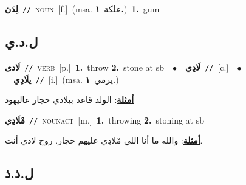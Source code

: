 \documentclass[10pt,a4paper,twoside]{article} %
\begin{document}
\begin{multicols}{2}
{\setlength\topsep{0pt}\textbf{\foreignlanguage{arabic}{لِدَن}}\ {\color{gray}\texttt{//}\color{black}}\ \textsc{noun}\ [f.]\ \color{gray}(msa. \foreignlanguage{arabic}{علكة}~\foreignlanguage{arabic}{\textbf{١.}})\color{black}\ \textbf{1.}~gum\ } \vspace{2mm}

\vspace{-3mm}
\subsection*{\color{blue}\foreignlanguage{arabic}{ل.د.ي}\color{blue}{}} 

{\setlength\topsep{0pt}\textbf{\foreignlanguage{arabic}{لَادى}}\ {\color{gray}\texttt{//}\color{black}}\ \textsc{verb}\ [p.]\ \textbf{1.}~throw  \textbf{2.}~stone at sb\ \ $\bullet$\ \ \setlength\topsep{0pt}\textbf{\foreignlanguage{arabic}{لَادِي}}\ {\color{gray}\texttt{//}\color{black}}\ [c.]\ \ $\bullet$\ \ \setlength\topsep{0pt}\textbf{\foreignlanguage{arabic}{يلَادِي}}\ {\color{gray}\texttt{//}\color{black}}\ [i.]\ \color{gray}(msa. \foreignlanguage{arabic}{يرمي}~\foreignlanguage{arabic}{\textbf{١.}})\color{black}\  \begin{flushright}\color{gray}\foreignlanguage{arabic}{\textbf{\underline{\foreignlanguage{arabic}{أمثلة}}}: الولد قاعد بيلادي حجار عاليهود}\end{flushright}\color{black}} \vspace{2mm}

{\setlength\topsep{0pt}\textbf{\foreignlanguage{arabic}{مْلَادِي}}\ {\color{gray}\texttt{//}\color{black}}\ \textsc{noun\textunderscore act}\ [m.]\ \textbf{1.}~throwing  \textbf{2.}~stoning at sb\  \begin{flushright}\color{gray}\foreignlanguage{arabic}{\textbf{\underline{\foreignlanguage{arabic}{أمثلة}}}: والله ما أنا اللي مْلادِي عليهم حجار. روح لادي أنت.}\end{flushright}\color{black}} \vspace{2mm}

\vspace{-3mm}
\subsection*{\color{blue}\foreignlanguage{arabic}{ل.ذ.ذ}\color{blue}{}} 


\end{multicols}
\end{document}
